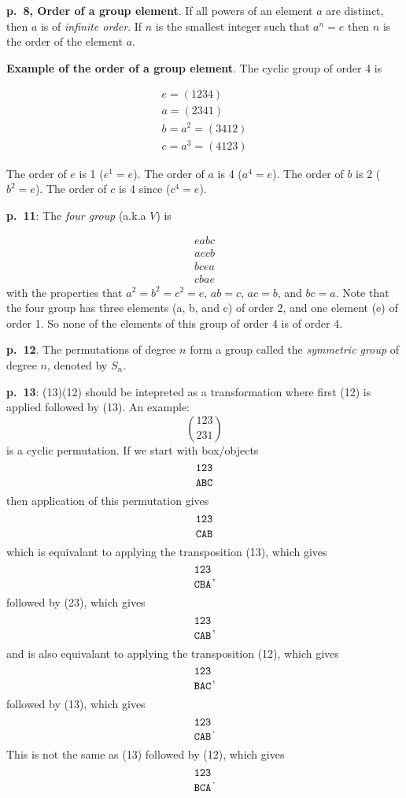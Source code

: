 \documentclass{book}
\begin{document}
{\bf p.\ 8, Order of a group element}. If all powers of an element $a$
are distinct, then $a$ is of {\it infinite order}. If $n$ is the
smallest integer such that $a^n = e$ then $n$ is the order of the
element $a$.

{\bf Example of the order of a group element}. The cyclic group of order 4 is

\begin{equation*}
\begin{split}
e = (1234) \\
a = (2341) \\
b = a^2 = (3412) \\
c = a^3 = (4123)
\end{split}
\end{equation*}

The order of $e$ is 1 ($e^1 = e$). The order of $a$ is 4 ($a^4 = e$). The order of $b$ is 2 ($b^2 = e$). The order of $c$ is 4 since ($c^4 = e$).

{\bf p.\ 11}: The {\it four group} (a.k.a $V$) is

\begin{equation}
\begin{split}
  eabc \\
  aecb \\
  bcea \\
  cbae
\end{split}
\end{equation}
with the properties that $a^2 = b^2 = c^2 = e$, $ab = c$, $ac = b$,
and $bc = a$. Note that the four group has three elements (a, b, and
c) of order 2, and one element (e) of order 1. So none of the elements
of this group of order 4 is of order 4.

{\bf p.\ 12}. The permutations of degree $n$ form a group called the {\it symmetric group} of degree $n$, denoted by $S_n$.

{\bf p.\ 13}: (13)(12) should be intepreted as a transformation where
first (12) is applied followed by (13). An example:
$$
\genfrac(){0pt}0{123}{231}
$$
is a cyclic permutation. If we start with box/objects
$$
\genfrac{}{}{0pt}0{\tt 123}{\tt ABC}
$$
then application of this permutation gives
$$
\genfrac{}{}{0pt}0{\tt 123}{\tt CAB}
$$
which is equivalant to applying the transposition (13), which gives
$$
\genfrac{}{}{0pt}0{\tt 123}{\tt CBA},
$$
followed by (23), which gives
$$
\genfrac{}{}{0pt}0{\tt 123}{\tt CAB},
$$
and is also equivalant to applying the transposition (12), which gives
$$
\genfrac{}{}{0pt}0{\tt 123}{\tt BAC},
$$
followed by (13), which gives
$$
\genfrac{}{}{0pt}0{\tt 123}{\tt CAB}.
$$
This is not the same as (13) followed by (12), which gives
$$
\genfrac{}{}{0pt}0{\tt 123}{\tt BCA}.
$$
\end{document}
